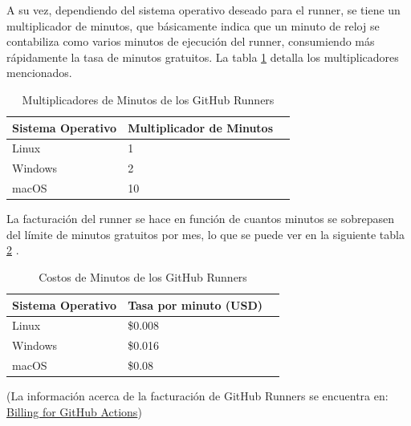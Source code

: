 A su vez, dependiendo del sistema operativo deseado para el runner, se tiene un multiplicador de minutos, que básicamente indica que un minuto de reloj se contabiliza como varios minutos de ejecución del runner, consumiendo más rápidamente la tasa de minutos gratuitos. La tabla \ref{tab:multiplicadores-minutos} detalla los multiplicadores mencionados.

\begin{table}[H]
\begin{center}
\begin{tabular}{lll}
\hline
\multicolumn{1}{|l|}{\textbf{Sistema Operativo}} & \multicolumn{1}{l|}{\textbf{Multiplicador de Minutos}} \\ \hline
\multicolumn{1}{|l|}{Linux} & \multicolumn{1}{l|}{1} \\ \hline
\multicolumn{1}{|l|}{Windows} & \multicolumn{1}{l|}{2} \\ \hline
\multicolumn{1}{|l|}{macOS} & \multicolumn{1}{l|}{10} \\ \hline
\end{tabular}
\caption{Multiplicadores de Minutos de los GitHub Runners}
\label{tab:multiplicadores-minutos}
\end{center}
\end{table}

La facturación del runner se hace en función de cuantos minutos se sobrepasen del límite de minutos gratuitos por mes, lo que se puede ver en la siguiente tabla \ref{tab:costos-minutos} .

\begin{table}[H]
\begin{center}
\begin{tabular}{lll}
\hline
\multicolumn{1}{|l|}{\textbf{Sistema Operativo}} & \multicolumn{1}{l|}{\textbf{Tasa por minuto (USD)}} \\ \hline
\multicolumn{1}{|l|}{Linux} & \multicolumn{1}{l|}{\$0.008} \\ \hline
\multicolumn{1}{|l|}{Windows} & \multicolumn{1}{l|}{\$0.016} \\ \hline
\multicolumn{1}{|l|}{macOS} & \multicolumn{1}{l|}{\$0.08} \\ \hline
\end{tabular}
\caption{Costos de Minutos de los GitHub Runners}
\label{tab:costos-minutos}
\end{center}
\end{table}

(La información acerca de la facturación de GitHub Runners se encuentra en: \href{https://docs.github.com/es/billing/managing-billing-for-github-actions/about-billing-for-github-actions}{Billing for GitHub Actions})

